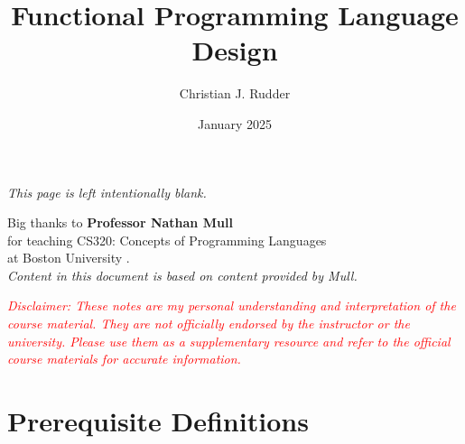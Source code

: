 \documentclass{memoir}
\title{Functional Programming Language Design}
\author{Christian J. Rudder}
\date{January 2025}
\begin{document}
\maketitle
\setcounter{secnumdepth}{2} %
\setcounter{tocdepth}{2}

\tableofcontents

\newpage
\thispagestyle{empty}
\mbox{}
\vfill
\begin{center}
    \textit{This page is left intentionally blank.}
\end{center}
\vfill
\newpage
\thispagestyle{empty}
\mbox{}
\vfill
\begin{center}
    \Large{Big thanks to \textbf{Professor Nathan Mull}}\\
    \normalsize 
    for teaching CS320: Concepts of Programming Languages\\
    at Boston University \cite{mull_cs320}.\\
    \textit{Content in this document is based on content provided by Mull.}\\
    \vfill
    \begin{center}
        \textcolor{red}{\textit{Disclaimer: These notes are my personal understanding and interpretation of the course material. 
        They are not officially endorsed by the instructor or the university. Please use them as a supplementary resource and refer 
        to the official course materials for accurate information.}}
    \end{center}
\end{center}

\vfill

\chapter*{Prerequisite Definitions}


% 
% 
% 
% 

% 
\end{document}
